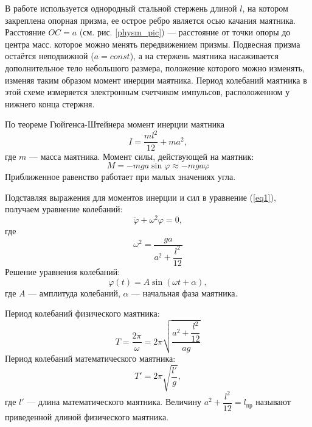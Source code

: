 \documentclass[12pt]{article}
\begin{document}
	В работе используется однородный стальной стержень длиной $l$, на котором закреплена опорная призма, ее острое ребро является осью качания маятника. Расстояние $OC = a$ (см. рис. \ref{physm_pic}) --- расстояние от точки опоры до центра масс. которое можно менять передвижением призмы. Подвесная призма остаётся неподвижной ($a = const$), а на стержень маятника насаживается дополнительное тело небольшого размера, положение которого можно изменять, изменяя таким образом момент инерции маятника. Период колебаний маятника в этой схеме измеряется электронным счетчиком импульсов, расположенном у нижнего конца стержня.
	
	По теореме Гюйгенса-Штейнера момент инерции маятника
	$$
	I = \frac{ml^2}{12} + ma^2,
	$$
	где $m$ --- масса маятника. Момент силы, действующей на маятник:
	$$
	M = -mga\sin{\varphi}\approx-mga\varphi
	$$
	Приближенное равенство работает при малых значениях угла.
	
	Подставляя выражения для моментов инерции и сил в уравнение (\ref{eq1}), получаем уравнение колебаний:
	$$
	\ddot{\varphi} + \omega^2\varphi = 0,
	$$
	где
	$$
	\omega^2 = \frac{ga}{a^2 + \dfrac{l^2}{12}}
	$$
	Решение уравнения колебаний:
	$$
	\varphi(t) = A\sin{(\omega t + \alpha)},
	$$
	где $A$ --- амплитуда колебаний, $\alpha$ --- начальная фаза маятника.
	
	Период колебаний физического маятника: 
	\begin{equation}\label{period_eq}
	T = \frac{2\pi}{\omega} = 2\pi\sqrt{\frac{a^2+\dfrac{l^2}{12}}{ag}}
	\end{equation}
	Период колебаний математического маятника:
	$$
	T' = 2\pi\sqrt{\frac{l'}{g}},
	$$
	где $l'$ --- длина математического маятника. Величину $a^2+\dfrac{l^2}{12} = l_{\text{пр}}$ называют приведенной длиной физического маятника.
	
\end{document}
